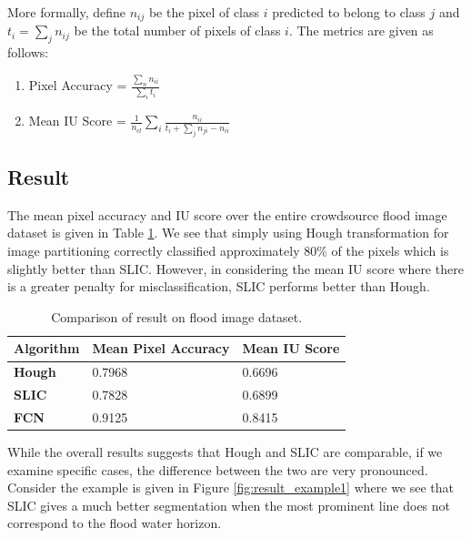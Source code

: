 \documentclass[review]{elsarticle}
\begin{document}
More formally, define $n_{ij}$ be the pixel of class $i$ predicted to belong to class $j$ and $t_i = \sum_j n_{ij}$ be the total number of pixels of class $i$. The metrics are given as follows:
\begin{enumerate}
\item Pixel Accuracy = $\frac{\sum_n n_{ii}}{\sum_i t_i}$
\item Mean IU Score = $ \frac{1}{n_{cl}} \sum_i \frac{n_{ii}}{t_i + \sum_j n_{ji} - n_{ii}}$
\end{enumerate}

\subsection{Result}

The mean pixel accuracy and IU score over the entire crowdsource flood image dataset is given in Table \ref{tab:result}. We see that simply using Hough transformation for image partitioning correctly classified approximately 80\% of the pixels which is slightly better than SLIC. However, in considering the mean IU score where there is a greater penalty for misclassification, SLIC performs better than Hough. 
\begin{table}[h!]
\centering
\caption{Comparison of result on flood image dataset.}
\label{tab:result}
\begin{tabular}{l|ll}
{\bf Algorithm} & {\bf Mean Pixel Accuracy} & {\bf Mean IU Score} \\
\hline
{\bf Hough}     & 0.7968         & 0.6696   \\
{\bf SLIC}      & 0.7828         & 0.6899   \\
{\bf FCN}      & 0.9125         & 0.8415  
\end{tabular}
\end{table}
While the overall results suggests that Hough and SLIC are comparable, if we examine specific cases, the difference between the two are very pronounced. Consider the example is given in Figure \ref{fig:result_example1} where we see that SLIC gives a much better segmentation when the most prominent line does not correspond to the flood water horizon. 
\end{document}
